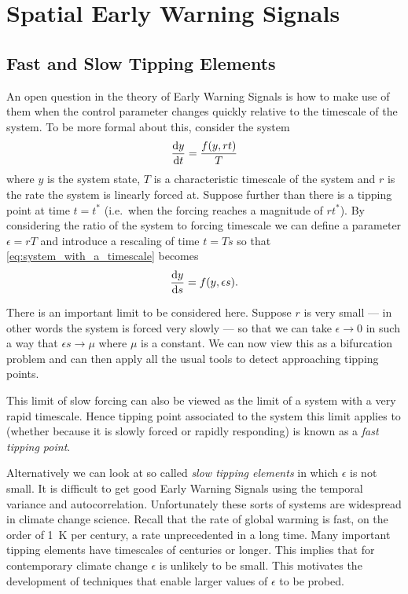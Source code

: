 \chapter{Spatial Early Warning Signals}
\graphicspath{{spatial_ews/figs}}

\section{Fast and Slow Tipping Elements}
An open question in the theory of Early Warning Signals is how to make use of them when the control parameter
changes quickly relative to the timescale of the system\cite{VanderBolt2021}.
To be more formal about this, consider the system
\begin{equation}
  \label{eq:system_with_a_timescale}
  \dv{y}{t} = \frac{f(y,rt)}{T}
\end{equation}
where $y$ is the system state, $T$ is a characteristic timescale of the system and $r$ is the rate the system is linearly forced
at. Suppose further than there is a tipping point at time $t = t^*$ (i.e.\ when the forcing reaches a magnitude of $rt^*$). By considering
the ratio of the system to forcing timescale we can define a parameter $\epsilon = rT$ and introduce a rescaling of time $t=Ts$
so that \cref{eq:system_with_a_timescale} becomes
\begin{equation}
  \label{eq:system_with_a_timescale_rescaled}
  \dv{y}{s} = f(y,\epsilon s).
\end{equation}

There is an important limit to be considered here. Suppose $r$ is very small --- in other words the system is forced very slowly --- so that we
can take $\epsilon\rightarrow 0$ in such a way that $\epsilon s \rightarrow \mu$ where $\mu$ is a constant. We can now view this as a bifurcation
problem and can then apply all the usual tools to detect approaching tipping points\cite{scheffer2009}.

This limit of slow forcing can also be viewed as the limit of a system with a very rapid timescale. Hence tipping point associated to the system
this limit applies to (whether because it is slowly forced or rapidly responding) is known as a \emph{fast tipping point}.

Alternatively we can look at so called \emph{slow tipping elements} in which $\epsilon$ is not small. It is difficult to get good Early Warning Signals
using the temporal variance and autocorrelation\cite{VanderBolt2021}. Unfortunately these sorts of systems are widespread in climate change science.
Recall that the rate of global warming is fast, on the order of \SI{1}{\kelvin} per century\cite{Osborn2021}, a rate unprecedented in
a long time. Many important tipping elements have timescales of centuries or longer.
This implies that for contemporary climate change $\epsilon$ is unlikely to be small. This motivates the development of techniques that enable
larger values of $\epsilon$ to be probed.

